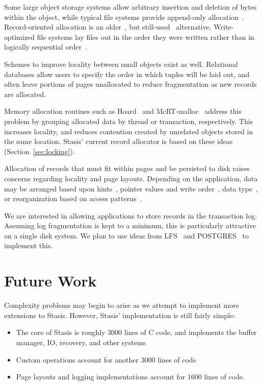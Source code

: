 \documentclass[letterpaper,twocolumn,10pt]{article}
\newcommand{\yad}{Stasis\xspace}
\newcommand{\yads}{Stasis'\xspace}
\newcommand{\rcs}[1]{\textcolor{green}{\bf RCS: #1}}
\begin{document}
Some large object storage systems allow arbitrary insertion and deletion of bytes~\cite{esm}
within the object, while typical file systems
provide append-only allocation~\cite{ffs}.
Record-oriented allocation is an older~\cite{multics}, but still-used~\cite{gfs}
alternative.  Write-optimized file systems lay files out in the order they
were written rather than in logically sequential order~\cite{lfs}.  

Schemes to improve locality between small
objects exist as well. Relational databases allow users to specify the order
in which tuples will be laid out, and often leave portions of pages
unallocated to reduce fragmentation as new records are allocated.

Memory allocation routines such as Hoard~\cite{hoard} and
McRT-malloc~\cite{mcrt} address this problem by grouping allocated
data by thread or transaction, respectively.  This increases
locality, and reduces contention created by unrelated objects stored
in the same location.
\yads current record allocator is based on these ideas (Section~\ref{sec:locking}).

Allocation of records that must fit within pages and be persisted to
disk raises concerns regarding locality and page layouts.  Depending
on the application, data may be arranged based upon
hints~\cite{cricket}, pointer values and write order~\cite{starburst},
data type~\cite{orion}, or reorganization based on access
patterns~\cite{storageReorganization}.


We are interested in allowing applications to store records in
the transaction log.  Assuming log fragmentation is kept to a
minimum, this is particularly attractive on a single disk system.  We
plan to use ideas from LFS~\cite{lfs} and POSTGRES~\cite{postgres}
to implement this.

\section{Future Work}

Complexity problems may begin to arise as we attempt to implement more
extensions to \yad.  However, \yads implementation is still fairly simple:

\begin{itemize}
\item The core of \yad is roughly 3000 lines
of C code, and implements the buffer manager, IO, recovery, and other
systems
\item Custom operations account for another 3000 lines of code
\item Page layouts and logging implementations account for 1600 lines of code.
\end{itemize}
\end{document}
